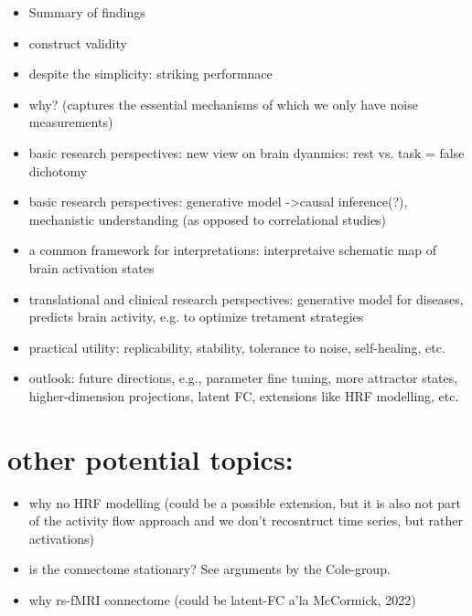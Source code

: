 \documentclass{article}
\begin{document}
\begin{itemize}
\item Summary of findings
\item construct validity
\item despite the simplicity: striking performnace
\item why? (captures the essential mechanisms of which we only have noise measurements)
\item basic research perspectives: new view on brain dyanmics: rest vs. task = false dichotomy
\item basic research perspectives: generative model -\textgreater  causal inference(?), mechanistic understanding (as opposed to correlational studies)
\item a common framework for interpretations: interpretaive schematic map of brain activation states
\item translational and clinical research perspectives: generative model for diseases, predicts brain activity, e.g. to optimize tretament strategies
\item practical utility: replicability, stability, tolerance to noise, self-healing, etc.
\item outlook: future directions, e.g., parameter fine tuning, more attractor states, higher-dimension projections, latent FC, extensions like HRF modelling, etc.
\end{itemize}

\section{other potential topics:}\label{other potential topics:}

\begin{itemize}
\item why no HRF modelling (could be a possible extension, but it is also not part of the activity flow approach and we don't recosntruct time series, but rather activations)
\item is the connectome stationary? See arguments by the Cole-group.
\item why rs-fMRI connectome (could be latent-FC a'la McCormick, 2022)
\end{itemize}
\end{document}

